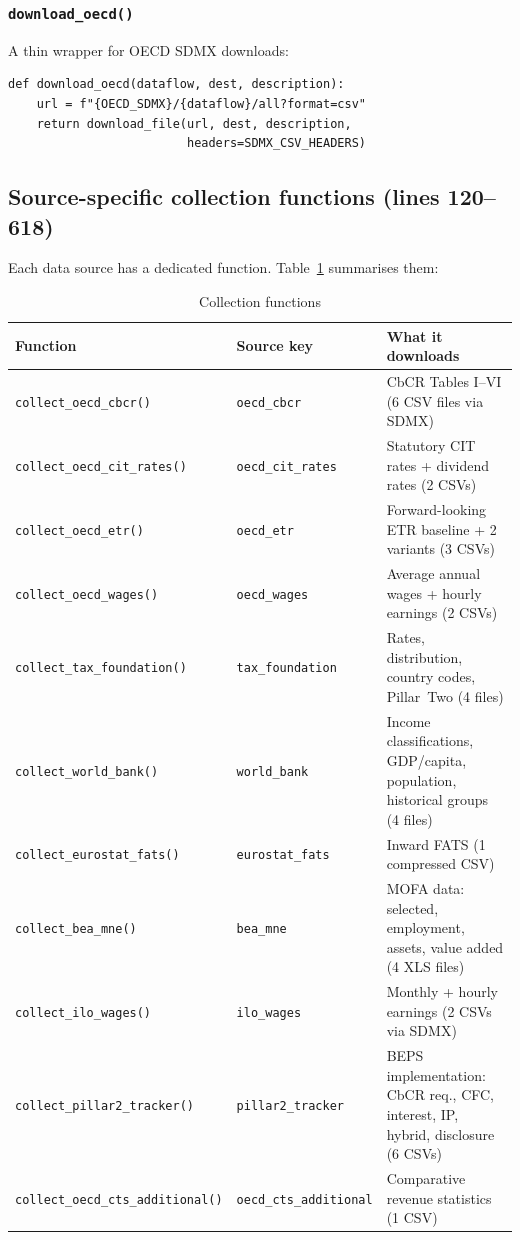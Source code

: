 \documentclass[12pt,a4paper]{article}
\begin{document}
\subsubsection{\texttt{download\_oecd()}}

A thin wrapper for OECD SDMX downloads:

\begin{lstlisting}[caption={\texttt{download\_oecd()} function},firstnumber=113]
def download_oecd(dataflow, dest, description):
    url = f"{OECD_SDMX}/{dataflow}/all?format=csv"
    return download_file(url, dest, description,
                         headers=SDMX_CSV_HEADERS)
\end{lstlisting}


\subsection{Source-specific collection functions (lines 120--618)}

Each data source has a dedicated function.
Table~\ref{tab:functions} summarises them:

\begin{table}[H]
\centering
\caption{Collection functions}
\label{tab:functions}
\small
\begin{tabular}{lp{3.5cm}p{5.5cm}}
\toprule
\textbf{Function} & \textbf{Source key} & \textbf{What it downloads} \\
\midrule
\texttt{collect\_oecd\_cbcr()} & \texttt{oecd\_cbcr} & CbCR Tables I--VI (6 CSV files via SDMX) \\
\texttt{collect\_oecd\_cit\_rates()} & \texttt{oecd\_cit\_rates} & Statutory CIT rates + dividend rates (2 CSVs) \\
\texttt{collect\_oecd\_etr()} & \texttt{oecd\_etr} & Forward-looking ETR baseline + 2 variants (3 CSVs) \\
\texttt{collect\_oecd\_wages()} & \texttt{oecd\_wages} & Average annual wages + hourly earnings (2 CSVs) \\
\texttt{collect\_tax\_foundation()} & \texttt{tax\_foundation} & Rates, distribution, country codes, Pillar~Two (4 files) \\
\texttt{collect\_world\_bank()} & \texttt{world\_bank} & Income classifications, GDP/capita, population, historical groups (4 files) \\
\texttt{collect\_eurostat\_fats()} & \texttt{eurostat\_fats} & Inward FATS (1 compressed CSV) \\
\texttt{collect\_bea\_mne()} & \texttt{bea\_mne} & MOFA data: selected, employment, assets, value added (4 XLS files) \\
\texttt{collect\_ilo\_wages()} & \texttt{ilo\_wages} & Monthly + hourly earnings (2 CSVs via SDMX) \\
\texttt{collect\_pillar2\_tracker()} & \texttt{pillar2\_tracker} & BEPS implementation: CbCR req., CFC, interest, IP, hybrid, disclosure (6 CSVs) \\
\texttt{collect\_oecd\_cts\_additional()} & \texttt{oecd\_cts\_additional} & Comparative revenue statistics (1 CSV) \\
\bottomrule
\end{tabular}
\end{table}
\end{document}
